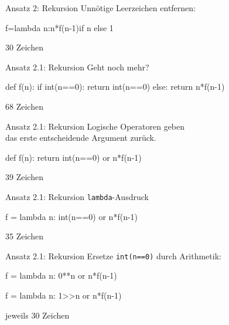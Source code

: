 \documentclass[xcolor=dvipsnames, aspectratio=169, 14pt]{beamer}
\begin{document}
\begin{frame}[fragile]{Ansatz 2: Rekursion}
	Unnötige Leerzeichen entfernen:
	
	\vfill
	
	\begin{python3code}
	f=lambda n:n*f(n-1)if n else 1
	\end{python3code}
	\vfill
	
	30 Zeichen
\end{frame}

\begin{frame}[fragile]{Ansatz 2.1: Rekursion}
	Geht noch mehr?
	
	\vfill
	
	\begin{python3code}
	def f(n):
	   if int(n==0):
	      return int(n==0)
	   else:
	      return n*f(n-1)
	\end{python3code}
	
	\vfill
	
	68 Zeichen
\end{frame}

\begin{frame}[fragile]{Ansatz 2.1: Rekursion}
	Logische Operatoren geben\\ das erste entscheidende Argument zurück.
	
	\vfill
	
	\begin{python3code}
	def f(n):
	   return int(n==0) or n*f(n-1)
	\end{python3code}
	
	\vfill
	
	39 Zeichen
\end{frame}

\begin{frame}[fragile]{Ansatz 2.1: Rekursion}
	\texttt{lambda}-Ausdruck
	
	\vfill
	
	\begin{python3code}
	f = lambda n: int(n==0) or n*f(n-1)
	\end{python3code}
	
	\vfill
	
	35 Zeichen
\end{frame}

\begin{frame}[fragile]{Ansatz 2.1: Rekursion}
	Ersetze \texttt{int(n==0)} durch Arithmetik:
	
	\vfill
	
	\begin{python3code}
	f = lambda n: 0**n or n*f(n-1)
	\end{python3code}
	
	\vfill
	
	\begin{python3code}
	f = lambda n: 1>>n or n*f(n-1)
	\end{python3code}
	
	\vfill
	
	jeweils 30 Zeichen
\end{frame}
\end{document}
